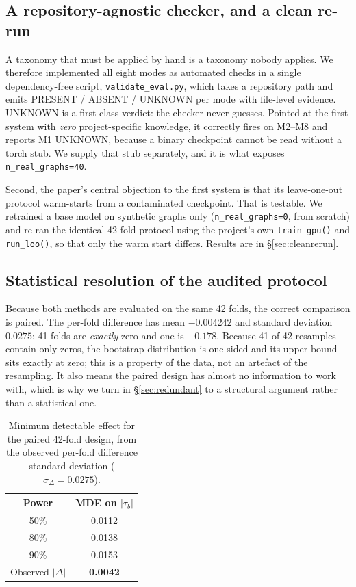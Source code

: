 \documentclass[conference]{IEEEtran}
\newcommand{\code}[1]{\texttt{\small #1}}
\begin{document}
\subsection{A repository-agnostic checker, and a clean re-run}

\label{sec:tool}
A taxonomy that must be applied by hand is a taxonomy nobody applies. We therefore
implemented all eight modes as automated checks in a single dependency-free script,
\code{validate\_eval.py}, which takes a repository path and emits PRESENT / ABSENT /
UNKNOWN per mode with file-level evidence. UNKNOWN is a first-class verdict: the checker
never guesses. Pointed at the first system with \emph{zero} project-specific knowledge, it
correctly fires on M2--M8 and reports M1 UNKNOWN, because a binary checkpoint cannot be
read without a torch stub. We supply that stub separately, and it is what exposes
\code{n\_real\_graphs=40}.

Second, the paper's central objection to the first system is that its leave-one-out
protocol warm-starts from a contaminated checkpoint. That is testable. We retrained a base
model on synthetic graphs only (\code{n\_real\_graphs=0}, from scratch) and re-ran the
identical 42-fold protocol using the project's own \code{train\_gpu()} and
\code{run\_loo()}, so that only the warm start differs. Results are in
\S\ref{sec:cleanrerun}.

\subsection{Statistical resolution of the audited protocol}

\label{sec:power}

Because both methods are evaluated on the same 42 folds, the correct comparison is paired.
The per-fold difference has mean $-0.004242$ and standard deviation $0.0275$: 41 folds are
\emph{exactly} zero and one is $-0.178$. Because 41 of 42 resamples contain only zeros, the
bootstrap distribution is one-sided and its upper bound sits exactly at zero; this is a
property of the data, not an artefact of the resampling. It also means the paired design has
almost no information to work with, which is why we turn in \S\ref{sec:redundant} to a
structural argument rather than a statistical one.

\begin{table}[t]
\centering
\caption{Minimum detectable effect for the paired 42-fold design, from the observed
per-fold difference standard deviation ($\sigma_\Delta = 0.0275$).}
\label{tab:mde}
\begin{tabular}{@{}cc@{}}
\toprule
\textbf{Power} & \textbf{MDE on $|\tau_b|$} \\
\midrule
50\% & 0.0112 \\
80\% & 0.0138 \\
90\% & 0.0153 \\
\midrule
Observed $|\Delta|$ & \textbf{0.0042} \\
\bottomrule
\end{tabular}
\end{table}
\end{document}
